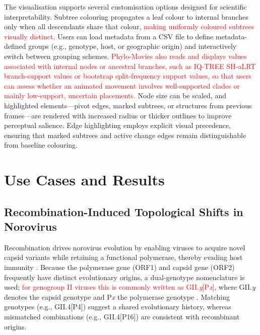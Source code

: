The visualisation supports several customisation options designed for scientific interpretability. Subtree colouring propagates a leaf colour to internal branches only when all descendants share that colour, \textcolor{red}{making uniformly coloured subtrees visually distinct}. Users can load metadata from a CSV file to define metadata-defined groups (e.g., genotype, host, or geographic origin) and interactively switch between grouping schemes. \textcolor{red}{Phylo-Movies also reads and displays values associated with internal nodes or ancestral branches, such as IQ-TREE SH-aLRT branch-support values or bootstrap split-frequency support values, so that users can assess whether an animated movement involves well-supported clades or mainly low-support, uncertain placements.} Node size can be scaled, and highlighted elements—pivot edges, marked subtrees, or structures from previous frames—are rendered with increased radius or thicker outlines to improve perceptual salience. Edge highlighting employs explicit visual precedence, ensuring that marked subtrees and active change edges remain distinguishable from baseline colouring.


\section{Use Cases and Results}
\subsection{Recombination-Induced Topological Shifts in Norovirus}
Recombination drives norovirus evolution by enabling viruses to acquire novel capsid variants while retaining a functional polymerase, thereby evading host immunity \citep{Chhabra2019, Lindesmith2008, Bull2005}. Because the polymerase gene (ORF1) and capsid gene (ORF2) frequently have distinct evolutionary origins, a dual-genotype nomenclature is used; \textcolor{red}{for genogroup II viruses this is commonly written as GII.\textit{y}[P\textit{x}]}, where GII.\textit{y} denotes the capsid genotype and P\textit{x} the polymerase genotype \citep{Chhabra2019}. Matching genotypes (e.g., GII.4[P4]) suggest a shared evolutionary history, whereas mismatched combinations (e.g., GII.4[P16]) are consistent with recombinant origins.

